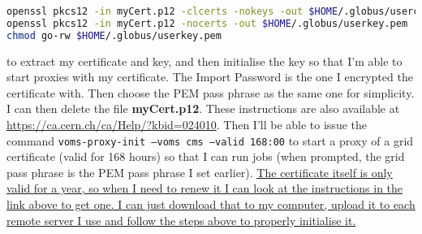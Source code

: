 \begin{lstlisting}[belowskip=-0.7cm, language=sh, numbers=none]
openssl pkcs12 -in myCert.p12 -clcerts -nokeys -out $HOME/.globus/usercert.pem
openssl pkcs12 -in myCert.p12 -nocerts -out $HOME/.globus/userkey.pem
chmod go-rw $HOME/.globus/userkey.pem
\end{lstlisting}

to extract my certificate and key, and then initialise the key so that I'm able to start proxies with my certificate. The Import Password is the one I encrypted the certificate with. Then choose the PEM pass phrase as the same one for simplicity. I can then delete the file \textbf{myCert.p12}. These instructions are also available at \url{https://ca.cern.ch/ca/Help/?kbid=024010}. Then I'll be able to issue the command \texttt{voms-proxy-init --voms cms --valid 168:00} to start a proxy of a grid certificate (valid for 168 hours) so that I can run jobs (when prompted, the grid pass phrase is the PEM pass phrase I set earlier). \uline{The certificate itself is only valid for a year, so when I need to renew it I can look at the instructions in the link above to get one. I can just download that to my computer, upload it to each remote server I use and follow the steps above to properly initialise it.}

